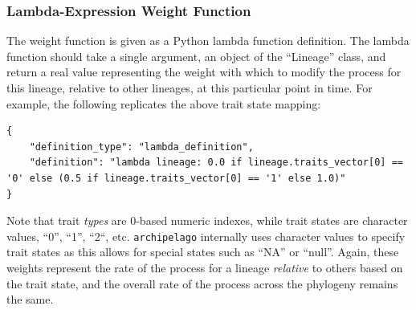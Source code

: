 \documentclass[11pt,openany]{memoir} %
\newcommand{\archipelagoPackage}{\texttt{archipelago}\xspace}
\begin{document}
\subsubsection{Lambda-Expression Weight Function}
The weight function is given as a Python lambda function definition.
The lambda function should take a single argument, an object of the ``Lineage'' class, and return a real value representing the weight with which to modify the process for this lineage, relative to other lineages, at this particular point in time.
For example, the following replicates the above trait state mapping:
\begin{lstlisting}
{
    "definition_type": "lambda_definition",
    "definition": "lambda lineage: 0.0 if lineage.traits_vector[0] == '0' else (0.5 if lineage.traits_vector[0] == '1' else 1.0)"
}
\end{lstlisting}
Note that trait \textit{types} are 0-based numeric indexes, while trait states are character values, ``0'', ``1'', ``2``, etc. \archipelagoPackage internally uses character values to specify trait states as this allows for special states such as ``NA'' or ``null''.
Again, these weights represent the rate of the process for a lineage \textit{relative} to others based on the trait state, and the overall rate of the process across the phylogeny remains the same.
\end{document}
